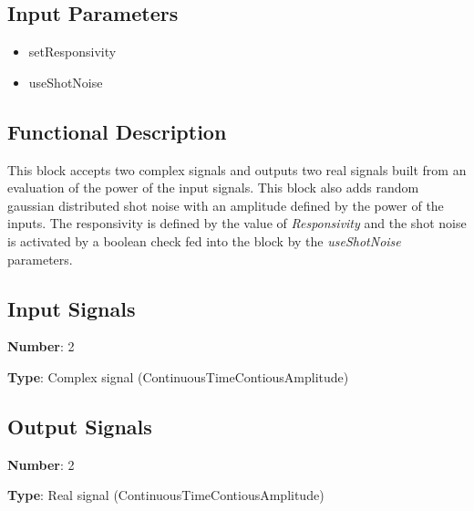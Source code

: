 \documentclass[../../sdf/tex/BPSK_system.tex]{subfiles}
\date{}
\begin{document}
\onlyinsubfile{\maketitle}

\subsection*{Input Parameters}

\begin{multicols}{2}
	\begin{itemize}
		\item setResponsivity
		\item useShotNoise
	\end{itemize}
\end{multicols}

\subsection*{Functional Description}

This block accepts two complex signals and outputs two real signals built from an evaluation of the power of the input signals. This block also adds random gaussian distributed shot noise with an amplitude defined by the power of the inputs. The responsivity is defined by the value of \textit{Responsivity} and the shot noise is activated by a boolean check fed into the block by the \textit{useShotNoise} parameters.


\subsection*{Input Signals}

\textbf{Number}: 2

\textbf{Type}: Complex signal (ContinuousTimeContiousAmplitude)

\subsection*{Output Signals}

\textbf{Number}: 2

\textbf{Type}: Real signal (ContinuousTimeContiousAmplitude)
\end{document}

